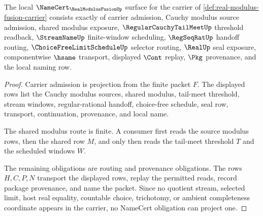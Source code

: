 \begin{theorem}
\label{thm:real-modulus-fusion-namecert-obligations}
The local $\NameCert_{\RealModulusFusionUp}$ surface for the carrier of \autoref{def:real-modulus-fusion-carrier} consists exactly of carrier admission, Cauchy modulus source admission, shared modulus exposure, $\RegularCauchyTailMeetUp$ threshold readback, $\StreamNameUp$ finite-window scheduling, $\RegSeqRatUp$ handoff routing, $\ChoiceFreeLimitScheduleUp$ selector routing, $\RealUp$ seal exposure, componentwise $\hsame$ transport, displayed $\Cont$ replay, $\Pkg$ provenance, and the local naming row.
\end{theorem}
\begin{proof}
Carrier admission is projection from the finite packet $F$. The displayed rows list the Cauchy modulus sources, shared modulus, tail-meet threshold, stream windows, regular-rational handoff, choice-free schedule, seal row, transport, continuation, provenance, and local name.

The shared modulus route is finite. A consumer first reads the source modulus rows, then the shared row $M$, and only then reads the tail-meet threshold $T$ and the scheduled windows $W$.

The remaining obligations are routing and provenance obligations. The rows $H,C,P,N$ transport the displayed rows, replay the permitted reads, record package provenance, and name the packet. Since no quotient stream, selected limit, host real equality, countable choice, trichotomy, or ambient completeness coordinate appears in the carrier, no NameCert obligation can project one.
\end{proof}

